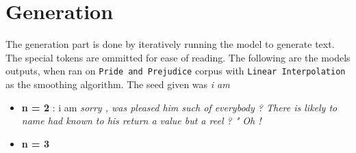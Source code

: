 \section*{Generation}

The generation part is done by iteratively running the model to generate text. The special tokens are ommitted for ease of reading. The following are the models outputs, when ran on \verb|Pride and Prejudice| corpus with \verb|Linear Interpolation| as the smoothing algorithm. The seed given was \textit{i am}


\begin{itemize}
    \item \textbf{n = 2} : i am \textit{sorry , was pleased him such of everybody ? There is likely to name had known to his return a value but a reel ? " Oh !}
    \item \textbf{n = 3}
\end{itemize}
